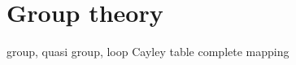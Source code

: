 \appendix
\chapter{Group theory} \label{App_group}
group, quasi group, loop
Cayley table
complete mapping
